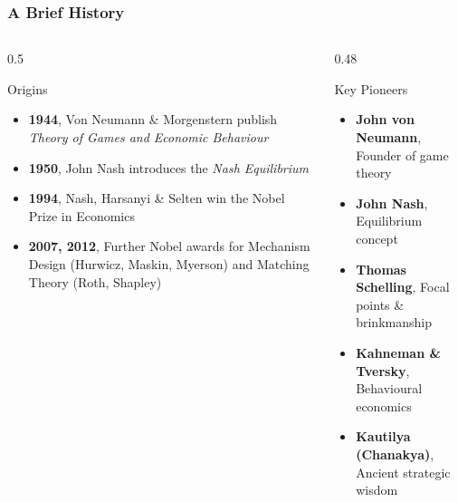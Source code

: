 \begin{frame}[fragile]\frametitle{A Brief History}
  \begin{columns}
    \begin{column}[T]{0.5\linewidth}
      \begin{block}{Origins}
        \begin{itemize}
          \item \textbf{1944}, Von Neumann \& Morgenstern publish \textit{Theory of Games and Economic Behaviour}
          \item \textbf{1950}, John Nash introduces the \textit{Nash Equilibrium}
          \item \textbf{1994}, Nash, Harsanyi \& Selten win the Nobel Prize in Economics
          \item \textbf{2007, 2012}, Further Nobel awards for Mechanism Design (Hurwicz, Maskin, Myerson) and Matching Theory (Roth, Shapley)
        \end{itemize}
      \end{block}
    \end{column}
    \begin{column}[T]{0.48\linewidth}
      \begin{block}{Key Pioneers}
        \begin{itemize}
          \item \textbf{John von Neumann}, Founder of game theory
          \item \textbf{John Nash}, Equilibrium concept
          \item \textbf{Thomas Schelling}, Focal points \& brinkmanship
          \item \textbf{Kahneman \& Tversky}, Behavioural economics
          \item \textbf{Kautilya (Chanakya)}, Ancient strategic wisdom
        \end{itemize}
      \end{block}
    \end{column}
  \end{columns}
\end{frame}

